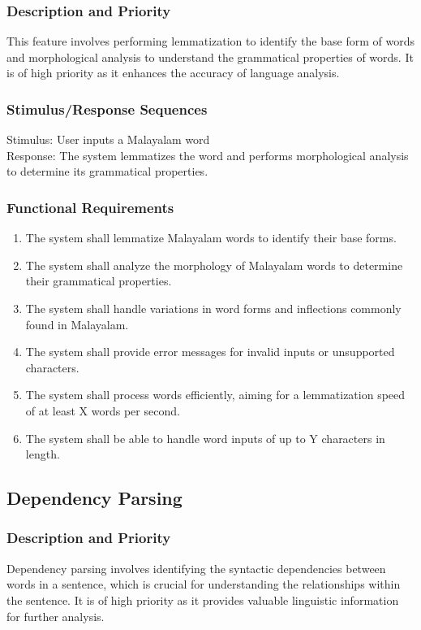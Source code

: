 \documentclass[12pt]{article}
\begin{document}
	\subsubsection{Description and Priority}
	This feature involves performing lemmatization to identify the base form of words and
	morphological analysis to understand the grammatical properties of words. It is of high
	priority as it enhances the accuracy of language analysis.
	
	\subsubsection{Stimulus/Response Sequences}
	Stimulus: User inputs a Malayalam word\\
	Response: The system lemmatizes the word and performs morphological analysis to
	determine its grammatical properties.
	
	\subsubsection{Functional Requirements}
	\begin{enumerate}
		\item The system shall lemmatize Malayalam words to identify their base forms.
		\item The system shall analyze the morphology of Malayalam words to determine their
		grammatical properties.
		\item The system shall handle variations in word forms and inflections commonly found
		in Malayalam.
		\item The system shall provide error messages for invalid inputs or unsupported
		characters.
		\item The system shall process words efficiently, aiming for a lemmatization speed of at
		least X words per second.
		\item The system shall be able to handle word inputs of up to Y characters in length.
	\end{enumerate}

	\subsection{Dependency Parsing}
	\subsubsection{Description and Priority}
	Dependency parsing involves identifying the syntactic dependencies between words in a
	sentence, which is crucial for understanding the relationships within the sentence. It is of
	high priority as it provides valuable linguistic information for further analysis.
	
\end{document}
